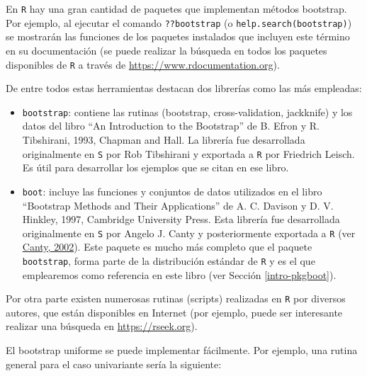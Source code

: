 \documentclass[
]{book}
\theoremstyle{break}
\theoremstyle{nonumberplain}
\begin{document}
En \texttt{R} hay una gran cantidad de paquetes que implementan métodos bootstrap.
Por ejemplo, al ejecutar el comando \texttt{??bootstrap} (o \texttt{help.search(\textquotesingle{}bootstrap\textquotesingle{})})
se mostrarán las funciones de los paquetes instalados que incluyen este término
en su documentación (se puede realizar la búsqueda en todos los paquetes disponibles
de \texttt{R} a través de \url{https://www.rdocumentation.org}).

De entre todos estas herramientas destacan dos librerías
como las más empleadas:

\begin{itemize}
\item
  \texttt{bootstrap}: contiene las rutinas (bootstrap, cross-validation,
  jackknife) y los datos del libro ``An Introduction to the Bootstrap'' de B.
  Efron y R. Tibshirani, 1993, Chapman and Hall. La librería fue
  desarrollada originalmente en \texttt{S} por Rob Tibshirani y exportada a \texttt{R} por
  Friedrich Leisch. Es útil para desarrollar los ejemplos que se citan en
  ese libro.
\item
  \texttt{boot}: incluye las funciones y conjuntos de datos utilizados en el libro
  ``Bootstrap Methods and Their Applications'' de A. C. Davison y D. V. Hinkley, 1997,
  Cambridge University Press. Esta librería fue desarrollada originalmente
  en \texttt{S} por Angelo J. Canty y posteriormente exportada a \texttt{R} (ver \href{http://cran.fhcrc.org/doc/Rnews/Rnews_2002-3.pdf}{Canty, 2002}).
  Este paquete es mucho más completo que el paquete \texttt{bootstrap}, forma parte de la distribución estándar de \texttt{R} y es el que emplearemos como referencia en este libro (ver Sección \ref{intro-pkgboot}).
\end{itemize}

Por otra parte existen numerosas rutinas (scripts) realizadas en \texttt{R} por
diversos autores, que están disponibles en Internet
(por ejemplo, puede ser interesante realizar una búsqueda en
\url{https://rseek.org}).

El bootstrap uniforme se puede implementar fácilmente. Por ejemplo,
una rutina general para el caso univariante sería la siguiente:
\end{document}
